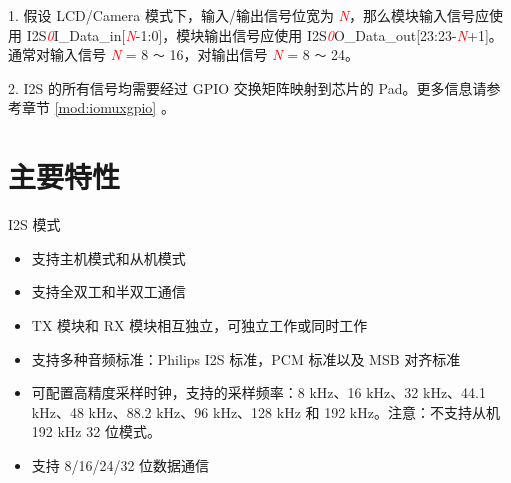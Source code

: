 \documentclass[main\_\_CN.tex]{subfiles}
\begin{document}
\begin{tiplisting}
1. 假设 LCD/Camera 模式下，输入/输出信号位宽为 \textcolor{red}{\it{N}}，那么模块输入信号应使用 I2S\textcolor{red}{\it{0}}I\_Data\_in[\textcolor{red}{\it{N}}-1:0]，模块输出信号应使用 I2S\textcolor{red}{\it{0}}O\_Data\_out[23:23-\textcolor{red}{\it{N}}+1]。通常对输入信号 \textcolor{red}{\it{N}} = 8 \verb+～+ 16，对输出信号 \textcolor{red}{\it{N}} = 8 \verb+～+ 24。

2. I2S 的所有信号均需要经过 GPIO 交换矩阵映射到芯片的 Pad。更多信息请参考章节 \ref{mod:iomuxgpio} \textit{}。
\end{tiplisting}

\section{主要特性}
I2S 模式
\begin{itemize}
    \item 支持主机模式和从机模式
    \item 支持全双工和半双工通信
    \item TX 模块和 RX 模块相互独立，可独立工作或同时工作
    \item 支持多种音频标准：Philips I2S 标准，PCM 标准以及 MSB 对齐标准
    \item 可配置高精度采样时钟，支持的采样频率：8 kHz、16 kHz、32 kHz、44.1 kHz、48 kHz、88.2 kHz、96 kHz、128 kHz 和 192 kHz。注意：不支持从机 192 kHz 32 位模式。
    \item 支持 8/16/24/32 位数据通信

\end{itemize}
\end{document}
